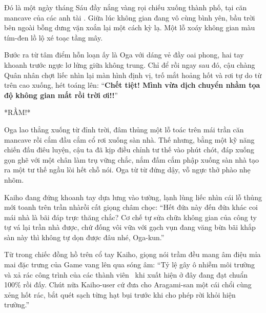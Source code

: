 \documentclass[../main.tex]{subfiles}
\begin{document}

Đó là một ngày tháng Sáu đầy nắng vàng rọi chiếu xuống thành phố, tại căn mancave của các anh tài \hls. Giữa lúc không gian đang vô cùng bình yên, bầu trời bên ngoài bỗng dưng vặn xoắn lại một cách kỳ lạ. Một lỗ xoáy không gian màu tím-đen lồ lộ xé toạc tầng mây.

Bước ra từ tâm điểm hỗn loạn ấy là Oga với dáng vẻ đầy oai phong, hai tay khoanh trước ngực lơ lửng giữa không trung. Chỉ để rồi ngay sau đó, cậu chàng Quân nhân chợt liếc nhìn lại màn hình định vị, trố mắt hoảng hốt và rơi tự do từ trên cao xuống, hét toáng lên: ``\textbf{Chết tiệt! Mình vừa dịch chuyển nhầm tọa độ không gian mất rồi trời ơi!!}''


*RẦM!*

Oga lao thẳng xuống từ đỉnh trời, đâm thủng một lỗ toác trên mái trần căn mancave rồi cắm đầu cắm cổ rơi xuống sàn nhà. Thế nhưng, bằng một kỹ năng chiến đấu điêu luyện, cậu ta đã kịp điều chỉnh tư thế vào phút chót, đáp xuống gọn ghẽ với một chân làm trụ vững chắc, nắm đấm cắm phập xuống sàn nhà tạo ra một tư thế ngầu lòi hết chỗ nói. Oga từ từ đứng dậy, vỗ ngực thở phào nhẹ nhõm.


Kaiho đang đứng khoanh tay dựa lưng vào tường, lạnh lùng liếc nhìn cái lỗ thủng mới toanh trên trần nhàrồi cất giọng châm chọc: ``Hết đứa này đến đứa khác coi mái nhà là bãi đáp trực thăng chắc? Cơ chế tự sửa chữa không gian của công ty tự vá lại trần nhà được, chứ đống vôi vữa với gạch vụn đang văng bừa bãi khắp sàn này thì không tự dọn được đâu nhé, Oga-kun.''

Từ trong chiếc đồng hồ trên cổ tay Kaiho, giọng nói trầm đều mang âm điệu mỉa mai đặc trưng của Game vang lên qua sóng âm: ``Tỷ lệ gây ô nhiễm môi trường và xả rác công trình của các thành viên \hls\ khi xuất hiện ở đây đang đạt chuẩn 100\% rồi đấy. Chút nữa Kaiho-user cứ đưa cho Aragami-san một cái chổi cùng xẻng hốt rác, bắt quét sạch từng hạt bụi trước khi cho phép rời khỏi hiện trường.''
\end{document}
